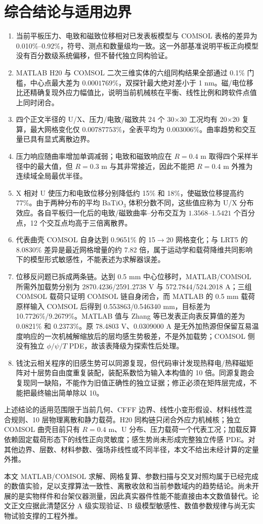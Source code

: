 \documentclass[UTF8,fontset=windows,11pt,a4paper]{ctexart}
\begin{document}
\section{综合结论与适用边界}

\begin{enumerate}[label=\arabic*.,leftmargin=2.3em]
\item 当前平板压力、电致和磁致位移相对已发表板模型与 COMSOL 表格的差异为 0.010\%--0.92\%，符号、测点和数量级均一致。这一外部基准说明平板正向模型没有百分数级系统偏移，但不替代独立同构验证。
\item MATLAB H20 与 COMSOL 二次三维实体的六组同构结果全部通过 0.1\% 门槛，中心点最大差为 $0.0001769\%$，双探针最大绝对差小于 1 nm。磁/电位移比还精确复现外应力幅值比，说明当前机械核在平衡、线性比例和跨软件点值上同时闭合。
\item 四个正文半径的 U/X、压力/电致/磁致共 24 个 30$\times$30 工况均有 20$\times$20 复算，最大网格变化仅 $0.00787753\%$，全表平均为 0.003006\%。曲率趋势和交互量已具有显式离散边界。
\item 压力响应随曲率增加单调减弱；电致和磁致响应在 $R=0.4$ m 取得四个采样半径中的最大值，但 $R=0.3$ m 与其非常接近，因此不能把 $R=0.4$ m 外推为连续域全局最优半径。
\item X 相对 U 使压力和电致位移分别降低约 15\% 和 18\%，使磁致位移提高约 77\%。由于两种分布的平均 BaTiO$_3$ 体积分数不同，这些值应称为 U/X 分布效应。各自平板归一化后的电致/磁致曲率--分布交互为 $1.3568$--$1.5421$ 个百分点，12 个交互点均高于三倍离散界。
\item 代表曲壳 COMSOL 自身达到 0.9651\% 的 15$\rightarrow$20 网格变化；与 LRT5 的 8.0830\% 差异是最近网格增量的约 7.82 倍，属于运动学和载荷降维共同影响下的模型形式敏感性，不能表述为求解器误差。
\item 位移反问题已拆成两条链。达到 0.5 mm 中心位移时，MATLAB/COMSOL 所需外加载势分别为 2870.4236/2591.2738 V 与 572.7844/524.2018 A；三组 COMSOL 载荷只证明 COMSOL 链自身闭合，而 MATLAB 的 0.5 mm 载荷原样输入 COMSOL 后得到 0.553863/0.546340 mm，目标差为 10.7726\%/9.2679\%。MATLAB 值与 Zhang 等已发表正向表反算值的差为 0.0821\% 和 0.2373\%。原 78.4803 V、0.0309000 A 是无外加热源但保留互易温度响应的一次机械解缩放后的层均感生势极差，不是外加载势；COMSOL 侧没有独立 $\phi/\psi/T$ PDE，故该表降级为探索性后处理。
\item 钱沈云相关程序的旧感生势可以同源复现，但代码审计发现热释电/热释磁矩阵对十层势自由度重复装配，装配系数恰为输入本构值的 10 倍。同源复跑会复现同一缺陷，不能作为旧值正确性的独立证据；修正必须在矩阵层完成，不能把最终输出简单除以 10。
\end{enumerate}

上述结论的适用范围限于当前几何、CFFF 边界、线性小变形假设、材料线性混合规则、10 层物理离散和静力载荷。H20 同构链只闭合外应力机械核；独立 COMSOL 曲壳目前只有 $R=0.4$ m、U 分布、压力载荷一个代表工况；加载反算依赖固定载荷形态下的线性正向灵敏度；感生势尚未形成完整独立传感 PDE。对其他边界、层数、材料参数、强场非线性或不同半径，本文不给出未经计算的定量外推。

本文 MATLAB/COMSOL 求解、网格复算、参数扫描与交叉对照均属于已经完成的数值实验，足以支撑算法一致性、离散收敛和当前参数域内的趋势结论。尚未开展的是实物样件和台架仪器测量，因此真实器件性能不能直接由本文数值替代。论文正文应据此清楚区分 A 级实现验证、B 级模型敏感性、数值参数规律与尚无实物试验支撑的工程外推。
\end{document}
